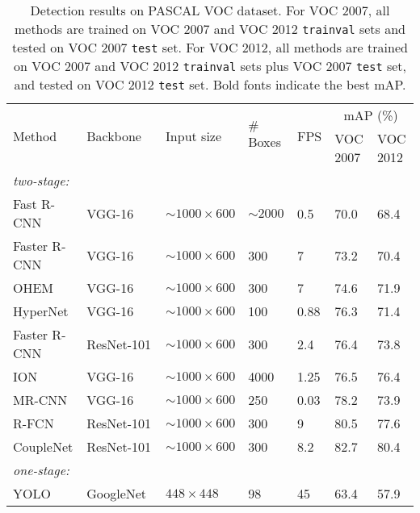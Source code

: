 \documentclass[10pt,twocolumn,letterpaper]{article}
\begin{document}
\begin{table*}[t]
\centering
\caption{Detection results on PASCAL VOC dataset. For VOC 2007, all methods are trained on VOC 2007 and VOC 2012 {\tt trainval} sets and tested on VOC 2007 {\tt test} set. For VOC 2012, all methods are trained on VOC 2007 and VOC 2012 {\tt trainval} sets plus VOC 2007 {\tt test} set, and tested on VOC 2012 {\tt test} set. Bold fonts indicate the best mAP.}
\footnotesize \setlength{\tabcolsep}{2.5pt}
\begin{tabular}{p{3.0cm}<{\centering}|p{3.0cm}<{\centering}|p{2.5cm}<{\centering}|p{1.5cm}<{\centering}|p{1.5cm}<{\centering}|p{2.2cm}<{\centering}|p{2.2cm}<{\centering}}
\toprule[1.5pt]
\multirow{2}{*}{Method} &\multirow{2}{*}{Backbone} &\multirow{2}{*}{Input size} &\multirow{2}{*}{$\#$Boxes} &\multirow{2}{*}{FPS} &\multicolumn{2}{c}{mAP (\%)} \\
\cline{6-7}
& & & & &VOC 2007 &VOC 2012 \\
\hline
\textit{two-stage:} & & & & & &\\
Fast R-CNN\cite{DBLP:conf/iccv/Girshick15}     &VGG-16 &$\sim1000\times600$ &$\sim2000$ &0.5 &70.0 &68.4\\
Faster R-CNN\cite{DBLP:journals/pami/RenHG017} &VGG-16 &$\sim1000\times600$ &300 &7 &73.2 &70.4\\
OHEM\cite{DBLP:conf/cvpr/ShrivastavaGG16}      &VGG-16 &$\sim1000\times600$ &300 &7 &74.6 &71.9\\
HyperNet\cite{DBLP:conf/cvpr/KongYCS16}        &VGG-16 &$\sim1000\times600$ &100 &0.88 &76.3 &71.4\\
Faster R-CNN\cite{DBLP:journals/pami/RenHG017} &ResNet-101 &$\sim1000\times600$ &300 &2.4 &76.4 & 73.8\\
ION\cite{DBLP:conf/cvpr/BellZBG16}             &VGG-16 &$\sim1000\times600$ &4000 &1.25 &76.5 &76.4\\
MR-CNN\cite{DBLP:conf/iccv/GidarisK15}         &VGG-16 &$\sim1000\times600$ &250 &0.03 &78.2 &73.9\\
R-FCN\cite{DBLP:conf/nips/DaiLHS16}            &ResNet-101 &$\sim1000\times600$ &300 &9 &80.5 &77.6\\
CoupleNet\cite{DBLP:conf/iccv/abs-1708-02863}  &ResNet-101 &$\sim1000\times600$ &300 &8.2 &82.7 &80.4\\
\hline
\hline
\textit{one-stage:} & & & & & &\\
YOLO\cite{DBLP:conf/cvpr/RedmonDGF16}       &GoogleNet~\cite{DBLP:conf/cvpr/SzegedyLJSRAEVR15} &$448\times448$ &98 &45 &63.4 &57.9\\

\end{tabular}
\end{table*}
\end{document}
